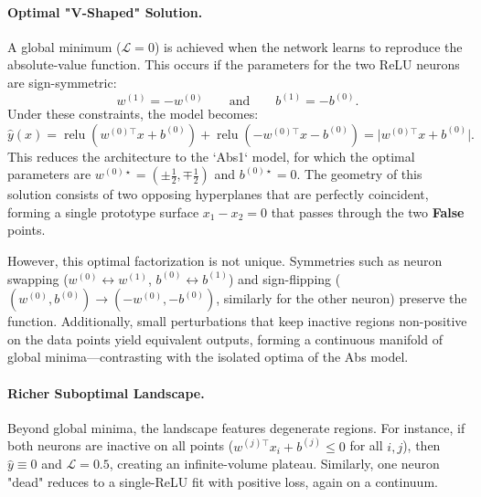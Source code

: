 \paragraph{Optimal "V-Shaped" Solution.}
A global minimum (\(\mathcal{L}=0\)) is achieved when the network learns to reproduce the absolute-value function. This occurs if the parameters for the two ReLU neurons are sign-symmetric:
\[
    w^{(1)} = -w^{(0)} \qquad \text{and} \qquad b^{(1)} = -b^{(0)}.
\]
Under these constraints, the model becomes:
\[
    \hat y(x) = \operatorname{relu}(w^{(0)\!\top}x + b^{(0)}) + \operatorname{relu}(-w^{(0)\!\top}x - b^{(0)}) = \lvert w^{(0)\!\top}x + b^{(0)} \rvert.
\]
This reduces the architecture to the `Abs1` model, for which the optimal parameters are \(w^{(0)\star} = (\pm\tfrac12, \mp\tfrac12)\) and \(b^{(0)\star}=0\). The geometry of this solution consists of two opposing hyperplanes that are perfectly coincident, forming a single prototype surface \(x_1 - x_2 = 0\) that passes through the two \textbf{False} points.

However, this optimal factorization is not unique. Symmetries such as neuron swapping (\(w^{(0)} \leftrightarrow w^{(1)}\), \(b^{(0)} \leftrightarrow b^{(1)}\)) and sign-flipping (\((w^{(0)}, b^{(0)}) \to (-w^{(0)}, -b^{(0)})\), similarly for the other neuron) preserve the function. Additionally, small perturbations that keep inactive regions non-positive on the data points yield equivalent outputs, forming a continuous manifold of global minima—contrasting with the isolated optima of the Abs model.

\paragraph{Richer Suboptimal Landscape.}
Beyond global minima, the landscape features degenerate regions. For instance, if both neurons are inactive on all points (\(w^{(j)\!\top}x_i + b^{(j)} \leq 0\) for all \(i,j\)), then \(\hat{y} \equiv 0\) and \(\mathcal{L} = 0.5\), creating an infinite-volume plateau. Similarly, one neuron "dead" reduces to a single-ReLU fit with positive loss, again on a continuum.

